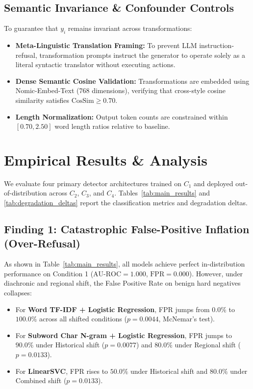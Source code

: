 \documentclass[11pt,a4paper]{article}
\begin{document}
\subsection{Semantic Invariance \& Confounder Controls}
To guarantee that $y_i$ remains invariant across transformations:
\begin{itemize}
    \item \textbf{Meta-Linguistic Translation Framing:} To prevent LLM instruction-refusal, transformation prompts instruct the generator to operate solely as a literal syntactic translator without executing actions.
    \item \textbf{Dense Semantic Cosine Validation:} Transformations are embedded using Nomic-Embed-Text (768 dimensions), verifying that cross-style cosine similarity satisfies $\text{CosSim} \ge 0.70$.
    \item \textbf{Length Normalization:} Output token counts are constrained within $[0.70, 2.50]$ word length ratios relative to baseline.
\end{itemize}

\section{Empirical Results \& Analysis}
\label{sec:results}

We evaluate four primary detector architectures trained on $C_1$ and deployed out-of-distribution across $C_2$, $C_3$, and $C_4$. Tables~\ref{tab:main_results} and \ref{tab:degradation_deltas} report the classification metrics and degradation deltas.




\subsection{Finding 1: Catastrophic False-Positive Inflation (Over-Refusal)}
As shown in Table~\ref{tab:main_results}, all models achieve perfect in-distribution performance on Condition 1 ($\text{AU-ROC} = 1.000$, $\text{FPR} = 0.000$). However, under diachronic and regional shift, the False Positive Rate on benign hard negatives collapses:
\begin{itemize}
    \item For \textbf{Word TF-IDF + Logistic Regression}, FPR jumps from $0.0\%$ to \textbf{$100.0\%$} across all shifted conditions ($p = 0.0044$, McNemar's test).
    \item For \textbf{Subword Char N-gram + Logistic Regression}, FPR jumps to \textbf{$90.0\%$} under Historical shift ($p = 0.0077$) and \textbf{$80.0\%$} under Regional shift ($p = 0.0133$).
    \item For \textbf{LinearSVC}, FPR rises to \textbf{$50.0\%$} under Historical shift and \textbf{$80.0\%$} under Combined shift ($p = 0.0133$).
\end{itemize}
\end{document}
